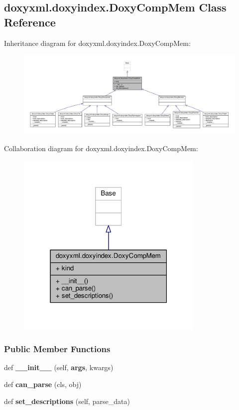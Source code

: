 \subsection{doxyxml.\+doxyindex.\+Doxy\+Comp\+Mem Class Reference}
\label{classdoxyxml_1_1doxyindex_1_1DoxyCompMem}


Inheritance diagram for doxyxml.\+doxyindex.\+Doxy\+Comp\+Mem\+:
\nopagebreak
\begin{figure}[H]
\begin{center}
\leavevmode
\includegraphics[width=350pt]{d3/d25/classdoxyxml_1_1doxyindex_1_1DoxyCompMem__inherit__graph}
\end{center}
\end{figure}


Collaboration diagram for doxyxml.\+doxyindex.\+Doxy\+Comp\+Mem\+:
\nopagebreak
\begin{figure}[H]
\begin{center}
\leavevmode
\includegraphics[width=255pt]{d0/dd7/classdoxyxml_1_1doxyindex_1_1DoxyCompMem__coll__graph}
\end{center}
\end{figure}
\subsubsection*{Public Member Functions}
\begin{DoxyCompactItemize}
\item 
def {\bf \+\_\+\+\_\+init\+\_\+\+\_\+} (self, {\bf args}, kwargs)
\item 
def {\bf can\+\_\+parse} (cls, obj)
\item 
def {\bf set\+\_\+descriptions} (self, parse\+\_\+data)
\end{DoxyCompactItemize}
